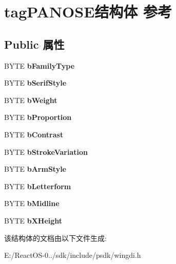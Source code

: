 \hypertarget{structtag_p_a_n_o_s_e}{}\section{tag\+P\+A\+N\+O\+S\+E结构体 参考}
\label{structtag_p_a_n_o_s_e}
\subsection*{Public 属性}
\begin{DoxyCompactItemize}
\item 
\mbox{\label{structtag_p_a_n_o_s_e_ae887833db446e7cf41dde5d80c31f162}} 
B\+Y\+TE {\bfseries b\+Family\+Type}
\item 
\mbox{\label{structtag_p_a_n_o_s_e_a433c5723482fe51626acb7c315e644d5}} 
B\+Y\+TE {\bfseries b\+Serif\+Style}
\item 
\mbox{\label{structtag_p_a_n_o_s_e_aa03011b21ed7651a475d0841b443d1af}} 
B\+Y\+TE {\bfseries b\+Weight}
\item 
\mbox{\label{structtag_p_a_n_o_s_e_a9681dd67b09de2eda972f6e4472d9e00}} 
B\+Y\+TE {\bfseries b\+Proportion}
\item 
\mbox{\label{structtag_p_a_n_o_s_e_a5891350d72c7fe496be31c61c52cf81e}} 
B\+Y\+TE {\bfseries b\+Contrast}
\item 
\mbox{\label{structtag_p_a_n_o_s_e_ae88e45f5ee3aa95587e2cf67090794eb}} 
B\+Y\+TE {\bfseries b\+Stroke\+Variation}
\item 
\mbox{\label{structtag_p_a_n_o_s_e_a894f15cceba1643a6f46d0215d844657}} 
B\+Y\+TE {\bfseries b\+Arm\+Style}
\item 
\mbox{\label{structtag_p_a_n_o_s_e_aa477e5718f52486b7de01f04cc972d90}} 
B\+Y\+TE {\bfseries b\+Letterform}
\item 
\mbox{\label{structtag_p_a_n_o_s_e_a07720662c6b10797c367f55f431a8ca2}} 
B\+Y\+TE {\bfseries b\+Midline}
\item 
\mbox{\label{structtag_p_a_n_o_s_e_aa30c6ccf94252342d1eddf480228ec8a}} 
B\+Y\+TE {\bfseries b\+X\+Height}
\end{DoxyCompactItemize}


该结构体的文档由以下文件生成\+:\begin{DoxyCompactItemize}
\item 
E\+:/\+React\+O\+S-\/0../sdk/include/psdk/wingdi.\+h\end{DoxyCompactItemize}
